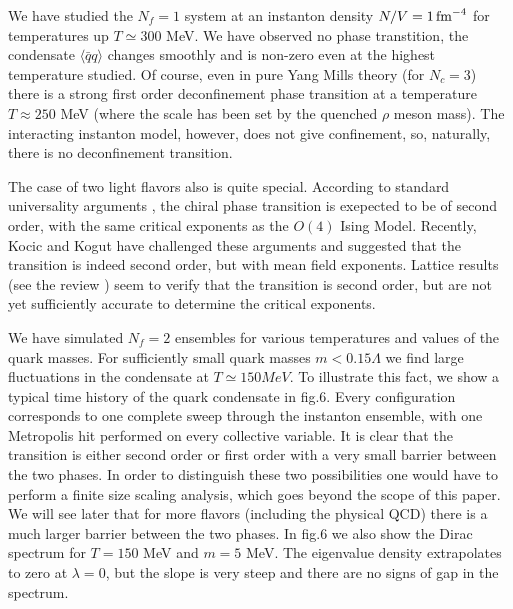    We have studied the $N_f=1$ system at an instanton density $N/V=1\,
{\rm fm}^{-4}$ for temperatures up $T\simeq 300$ MeV.  We have observed
no phase transtition, the condensate $\langle\bar qq\rangle$ changes
smoothly and is non-zero even at the highest temperature studied. Of
course, even in pure Yang Mills theory (for $N_c=3$) there is a strong
first order deconfinement phase transition at a temperature $T\approx
250$ MeV (where the scale has been set by the quenched $\rho$ meson
mass). The interacting instanton model, however, does not give confinement,
so, naturally, there is no deconfinement transition.

    The case of two light flavors also is quite special. According to
standard universality arguments \cite{PW_84}, the chiral phase transition
is exepected to be of second order, with the same critical exponents as
the $O(4)$ Ising Model. Recently, Kocic and Kogut \cite{KK_95} have
challenged these arguments and suggested that the transition is indeed
second order, but with mean field exponents. Lattice results (see the review
\cite{deT_95}) seem to verify that the transition is second order, but
are not yet sufficiently accurate to determine the critical exponents.

   We have simulated $N_f=2$ ensembles for various temperatures and
values of the quark masses. For sufficiently small quark masses
$m<0.15\Lambda$ we find large fluctuations in the condensate at
$T\simeq 150 MeV$. To illustrate this fact, we show a typical time
history of the quark condensate in fig.6. Every configuration
corresponds to one complete sweep through the instanton ensemble,
with one Metropolis hit performed on every collective variable.
It is clear that the transition is either second order or first
order with a very small barrier between the two phases. In order
to distinguish these two possibilities one would have to perform
a finite size scaling analysis, which goes beyond the scope of
this paper. We will see later that for more flavors (including
the physical QCD) there is a much larger barrier between the two
phases. In fig.6 we also show the Dirac spectrum for $T=150$ MeV
and $m=5$ MeV. The eigenvalue density extrapolates to zero at
$\lambda=0$, but the slope is very steep and there are no signs
of gap in the spectrum.

